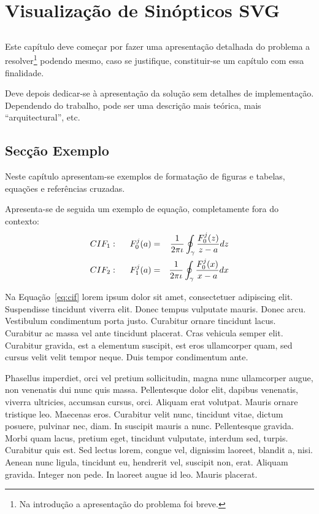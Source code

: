 \chapter{Visualização de Sinópticos SVG}\label{chap:chap3}

\section*{}

Este capítulo deve começar por fazer uma apresentação detalhada do
problema a resolver\footnote{Na introdução a apresentação do
  problema foi breve.} podendo mesmo, caso se justifique,
constituir-se um capítulo com essa finalidade.

Deve depois dedicar-se à apresentação da solução sem detalhes de
implementação. 
Dependendo do trabalho, pode ser uma descrição mais teórica, mais
``arquitectural'', etc.

\section{Secção Exemplo}

Neste capítulo apresentam-se exemplos de formatação de figuras e
tabelas, equações e referências cruzadas.

Apresenta-se de seguida um exemplo de equação, completamente fora do contexto:
\begin{eqnarray}
CIF_1: \hspace*{5mm}F_0^j(a) &=& \frac{1}{2\pi \iota} \oint_{\gamma} \frac{F_0^j(z)}{z - a} dz\\
CIF_2: \hspace*{5mm}F_1^j(a) &=& \frac{1}{2\pi \iota} \oint_{\gamma} \frac{F_0^j(x)}{x - a} dx \label{eq:cif}
\end{eqnarray}

Na Equação~\ref{eq:cif} lorem ipsum dolor sit amet, consectetuer
adipiscing elit. Suspendisse tincidunt viverra elit. Donec tempus
vulputate mauris. Donec arcu. Vestibulum condimentum porta
justo. Curabitur ornare tincidunt lacus. Curabitur ac massa vel ante
tincidunt placerat. Cras vehicula semper elit. Curabitur gravida, est
a elementum suscipit, est eros ullamcorper quam, sed cursus velit
velit tempor neque. Duis tempor condimentum ante.

Phasellus imperdiet, orci vel pretium sollicitudin, magna nunc
ullamcorper augue, non venenatis dui nunc quis massa. Pellentesque
dolor elit, dapibus venenatis, viverra ultricies, accumsan cursus,
orci. Aliquam erat volutpat. Mauris ornare tristique leo. Maecenas
eros. Curabitur velit nunc, tincidunt vitae, dictum posuere, pulvinar
nec, diam. In suscipit mauris a nunc. Pellentesque gravida. Morbi quam
lacus, pretium eget, tincidunt vulputate, interdum sed,
turpis. Curabitur quis est. Sed lectus lorem, congue vel, dignissim
laoreet, blandit a, nisi. Aenean nunc ligula, tincidunt eu, hendrerit
vel, suscipit non, erat. Aliquam gravida. Integer non pede. In laoreet
augue id leo. Mauris placerat. 

